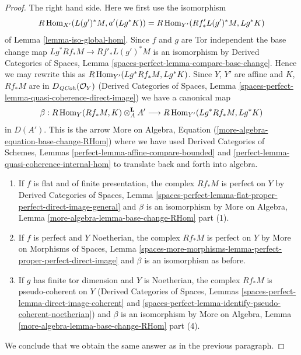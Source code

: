 \begin{proof}
\medskip\noindent
The right hand side. Here we first use the isomorphism
$$
R\mathop{\mathrm{Hom}}\nolimits_{X'}(L(g')^*M, a'(Lg^*K)) = R\mathop{\mathrm{Hom}}\nolimits_{Y'}(Rf'_*L(g')^*M, Lg^*K)
$$
of Lemma \ref{lemma-iso-global-hom}. Since $f$ and $g$ are
Tor independent the base change
map $Lg^*Rf_*M \to Rf'_*L(g')^*M$ is an isomorphism by
Derived Categories of Spaces, Lemma
\ref{spaces-perfect-lemma-compare-base-change}.
Hence we may rewrite this as $R\mathop{\mathrm{Hom}}\nolimits_{Y'}(Lg^*Rf_*M, Lg^*K)$.
Since $Y$, $Y'$ are affine and $K$, $Rf_*M$ are in $D_{\mathit{QCoh}}(\mathcal{O}_Y)$
(Derived Categories of Spaces, Lemma
\ref{spaces-perfect-lemma-quasi-coherence-direct-image})
we have a canonical map
$$
\beta :
R\mathop{\mathrm{Hom}}\nolimits_Y(Rf_*M, K) \otimes^\mathbf{L}_A A'
\longrightarrow
R\mathop{\mathrm{Hom}}\nolimits_{Y'}(Lg^*Rf_*M, Lg^*K)
$$
in $D(A')$. This is the arrow
More on Algebra, Equation (\ref{more-algebra-equation-base-change-RHom})
where we have used Derived Categories of Schemes, Lemmas
\ref{perfect-lemma-affine-compare-bounded} and
\ref{perfect-lemma-quasi-coherence-internal-hom}
to translate back and forth into algebra.
\begin{enumerate}
\item If $f$ is flat and of finite presentation, the complex $Rf_*M$
is perfect on $Y$ by Derived Categories of Spaces, Lemma
\ref{spaces-perfect-lemma-flat-proper-perfect-direct-image-general}
and $\beta$ is an isomorphism by
More on Algebra, Lemma \ref{more-algebra-lemma-base-change-RHom} part (1).
\item If $f$ is perfect and $Y$ Noetherian, the complex $Rf_*M$
is perfect on $Y$ by More on Morphisms of Spaces, Lemma
\ref{spaces-more-morphisms-lemma-perfect-proper-perfect-direct-image}
and $\beta$ is an isomorphism as before.
\item If $g$ has finite tor dimension and $Y$ is Noetherian,
the complex $Rf_*M$ is pseudo-coherent on $Y$
(Derived Categories of Spaces, Lemmas
\ref{spaces-perfect-lemma-direct-image-coherent} and
\ref{spaces-perfect-lemma-identify-pseudo-coherent-noetherian})
and $\beta$ is an isomorphism by
More on Algebra, Lemma \ref{more-algebra-lemma-base-change-RHom} part (4).
\end{enumerate}
We conclude that we obtain the same answer as in the previous paragraph.


\end{proof}
